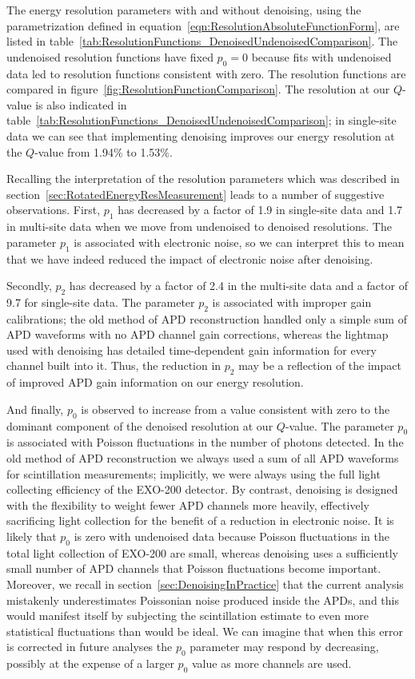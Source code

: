 The energy resolution parameters with and without denoising, using the parametrization defined in equation~\ref{eqn:ResolutionAbsoluteFunctionForm}, are listed in table~\ref{tab:ResolutionFunctions_DenoisedUndenoisedComparison}.  The undenoised resolution functions have fixed $p_0 = 0$ because fits with undenoised data led to resolution functions consistent with zero.  The resolution functions are compared in figure~\ref{fig:ResolutionFunctionComparison}.  The resolution at our $Q$-value is also indicated in table~\ref{tab:ResolutionFunctions_DenoisedUndenoisedComparison}; in single-site data we can see that implementing denoising improves our energy resolution at the $Q$-value from 1.94\% to 1.53\%.

Recalling the interpretation of the resolution parameters which was described in section~\ref{sec:RotatedEnergyResMeasurement} leads to a number of suggestive observations.  First, $p_1$ has decreased by a factor of 1.9 in single-site data and 1.7 in multi-site data when we move from undenoised to denoised resolutions.  The parameter $p_1$ is associated with electronic noise, so we can interpret this to mean that we have indeed reduced the impact of electronic noise after denoising.

Secondly, $p_2$ has decreased by a factor of 2.4 in the multi-site data and a factor of 9.7 for single-site data.  The parameter $p_2$ is associated with improper gain calibrations; the old method of APD reconstruction handled only a simple sum of APD waveforms with no APD channel gain corrections, whereas the lightmap used with denoising has detailed time-dependent gain information for every channel built into it.  Thus, the reduction in $p_2$ may be a reflection of the impact of improved APD gain information on our energy resolution.

And finally, $p_0$ is observed to increase from a value consistent with zero to the dominant component of the denoised resolution at our $Q$-value.  The parameter $p_0$ is associated with Poisson fluctuations in the number of photons detected.  In the old method of APD reconstruction we always used a sum of all APD waveforms for scintillation measurements; implicitly, we were always using the full light collecting efficiency of the EXO-200 detector.  By contrast, denoising is designed with the flexibility to weight fewer APD channels more heavily, effectively sacrificing light collection for the benefit of a reduction in electronic noise.  It is likely that $p_0$ is zero with undenoised data because Poisson fluctuations in the total light collection of EXO-200 are small, whereas denoising uses a sufficiently small number of APD channels that Poisson fluctuations become important.  Moreover, we recall in section~\ref{sec:DenoisingInPractice} that the current analysis mistakenly underestimates Poissonian noise produced inside the APDs, and this would manifest itself by subjecting the scintillation estimate to even more statistical fluctuations than would be ideal.  We can imagine that when this error is corrected in future analyses the $p_0$ parameter may respond by decreasing, possibly at the expense of a larger $p_0$ value as more channels are used.

